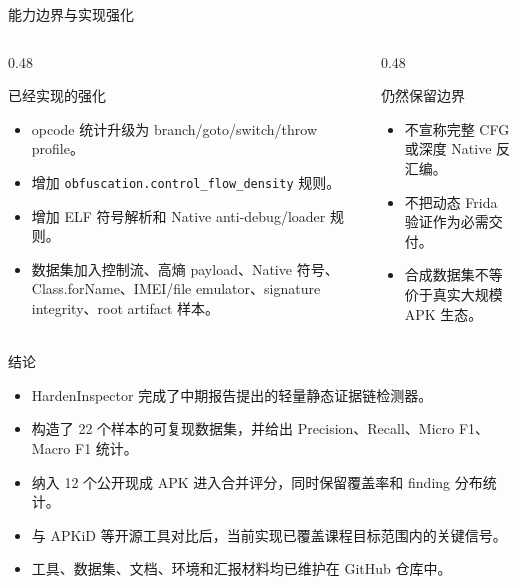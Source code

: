 \documentclass[10pt,aspectratio=169]{beamer}
\begin{document}
\begin{frame}{能力边界与实现强化}
  \begin{columns}[T,totalwidth=\textwidth]
    \begin{column}{0.48\textwidth}
      \begin{block}{已经实现的强化}
        \begin{itemize}
          \item opcode 统计升级为 branch/goto/switch/throw profile。
          \item 增加 \texttt{obfuscation.control\_flow\_density} 规则。
          \item 增加 ELF 符号解析和 Native anti-debug/loader 规则。
          \item 数据集加入控制流、高熵 payload、Native 符号、Class.forName、IMEI/file emulator、signature integrity、root artifact 样本。
        \end{itemize}
      \end{block}
    \end{column}
    \begin{column}{0.48\textwidth}
      \begin{block}{仍然保留边界}
        \begin{itemize}
          \item 不宣称完整 CFG 或深度 Native 反汇编。
          \item 不把动态 Frida 验证作为必需交付。
          \item 合成数据集不等价于真实大规模 APK 生态。
        \end{itemize}
      \end{block}
    \end{column}
  \end{columns}
\end{frame}

\begin{frame}{结论}
  \begin{itemize}
    \item HardenInspector 完成了中期报告提出的轻量静态证据链检测器。
    \item 构造了 22 个样本的可复现数据集，并给出 Precision、Recall、Micro F1、Macro F1 统计。
    \item 纳入 12 个公开现成 APK 进入合并评分，同时保留覆盖率和 finding 分布统计。
    \item 与 APKiD 等开源工具对比后，当前实现已覆盖课程目标范围内的关键信号。
    \item 工具、数据集、文档、环境和汇报材料均已维护在 GitHub 仓库中。
  \end{itemize}
\end{frame}
\end{document}
